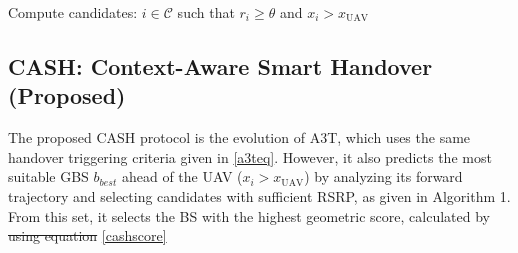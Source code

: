 \documentclass[conference]{IEEEtran}
\begin{document}
\begin{algorithm}[!t]
\caption{CASH: Context-Aware Smart Handover}


Compute candidates: $i \in \mathcal{C}$ such that $r_i \geq \theta$ and $x_i > x_{\text{UAV}}$\;


\end{algorithm}




\subsection{CASH: Context-Aware Smart Handover (Proposed)}
The proposed CASH protocol is the evolution of A3T, which uses the same handover triggering criteria given in \eqref{a3teq}. However, it also predicts the most suitable GBS $b_{best}$ ahead of the UAV ($x_i > x_{\text{UAV}}$) by analyzing its forward trajectory and selecting candidates with sufficient RSRP, as given in Algorithm 1. From this set, it selects the BS with the highest geometric score, calculated by \st{using equation} \eqref{cashscore}
\end{document}

